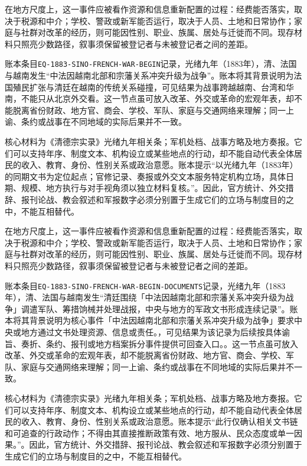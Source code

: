 在地方尺度上，这一事件应被看作资源和信息重新配置的过程：经费能否落实，取决于税源和中介；学校、警政或新军能否运行，取决于人员、土地和日常协作；家庭与社群对改革的经历，则可能因性别、职业、族属、居处与迁徙而不同。现存材料只照亮少数路径，叙事须保留被登记者与未被登记者之间的差距。

账本条目\texttt{EQ-1883-SINO-FRENCH-WAR-BEGIN}记录，光绪九年（1883年），清、法国与越南发生“中法因越南北部和宗藩关系冲突升级为战争”。账本将其背景说明为法国殖民扩张与清廷在越南的传统关系碰撞，可见结果为战事跨越越南、台湾和华南，不能只从北京外交看。这一节点虽可放入改革、外交或革命的宏观年表，却不能脱离省份财政、地方官、商会、学校、军队、家庭与交通网络来理解；同一上谕、条约或战事在不同地域的实际后果并不一致。

核心材料为《清德宗实录》光绪九年相关条；军机处档、战事方略及地方奏报。它们可以支持年序、制度文本、机构设立或某些地点的行动，却不能自动代表全体居民的收入、教育、身份、性别关系或政治意愿。账本提示“以光绪九年（1883年）的同期文书为定位起点；官修记录、奏报或外交文本服务特定机构立场，具体日期、规模、地方执行与对手视角须以独立材料复核。”。因此，官方统计、外交措辞、报刊论战、教会叙述和军报数字必须分别置于生成它们的立场与制度目的之中，不能互相替代。

在地方尺度上，这一事件应被看作资源和信息重新配置的过程：经费能否落实，取决于税源和中介；学校、警政或新军能否运行，取决于人员、土地和日常协作；家庭与社群对改革的经历，则可能因性别、职业、族属、居处与迁徙而不同。现存材料只照亮少数路径，叙事须保留被登记者与未被登记者之间的差距。

账本条目\texttt{EQ-1883-SINO-FRENCH-WAR-BEGIN-DOCUMENTS}记录，光绪九年（1883年），清、法国与越南发生“清廷围绕「中法因越南北部和宗藩关系冲突升级为战争」调遣军队、筹措饷械并处理战报，中央与地方的军政文书形成连续记录”。账本将其背景说明为核心事件「中法因越南北部和宗藩关系冲突升级为战争」要求中央或地方通过文书处理资源、信息或责任。，可见结果为该记录为后续按具体谕旨、奏折、条约、报刊或地方档案拆分事件提供可回查入口。。这一节点虽可放入改革、外交或革命的宏观年表，却不能脱离省份财政、地方官、商会、学校、军队、家庭与交通网络来理解；同一上谕、条约或战事在不同地域的实际后果并不一致。

核心材料为《清德宗实录》光绪九年相关条；军机处档、战事方略及地方奏报。它们可以支持年序、制度文本、机构设立或某些地点的行动，却不能自动代表全体居民的收入、教育、身份、性别关系或政治意愿。账本提示“此行仅确认相关文书链和可追查的行政动作；不得由其直接推断政策有效、地方服从、民众态度或单一因果。”。因此，官方统计、外交措辞、报刊论战、教会叙述和军报数字必须分别置于生成它们的立场与制度目的之中，不能互相替代。


